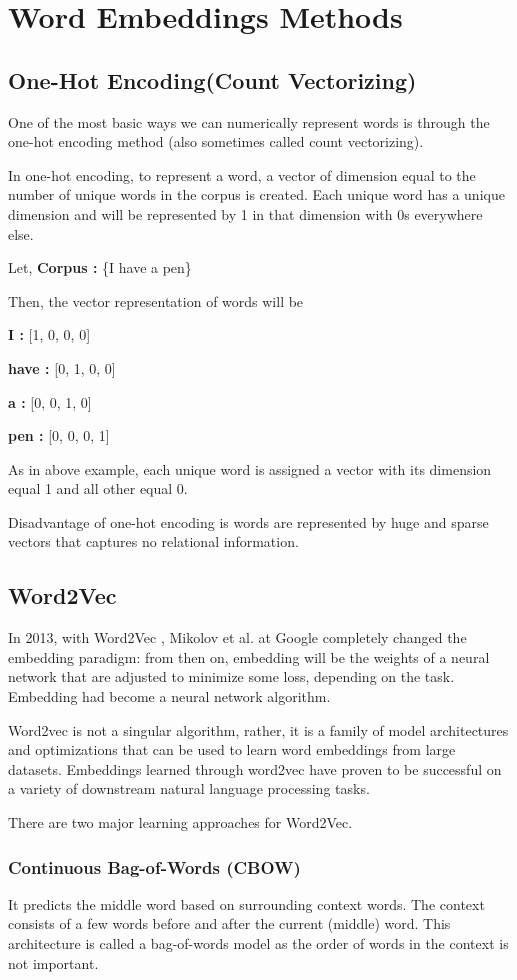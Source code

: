 \section{Word Embeddings Methods}
\subsection{One-Hot Encoding(Count Vectorizing)}
One of the most basic ways we can numerically represent words is through the one-hot encoding method (also sometimes called count vectorizing).

In one-hot encoding, to represent a word, a vector of dimension equal to the number of unique words in the corpus is created. Each unique word has a unique dimension and will be represented by 1 in that dimension with 0s everywhere else.

Let, \textbf{Corpus : } \{I have a pen\}

Then, the vector representation of words will be

\textbf{I : } [1, 0, 0, 0]

\textbf{have : } [0, 1, 0, 0]

\textbf{a : } [0, 0, 1, 0]

\textbf{pen : } [0, 0, 0, 1]

As in above example, each unique word is assigned a vector with its dimension equal 1 and all other equal 0.

Disadvantage of one-hot encoding is words are represented by huge and sparse vectors that captures no relational information.

\subsection{Word2Vec}
In 2013, with Word2Vec , Mikolov et al. at Google completely changed the embedding paradigm: from then on, embedding will be the weights of a neural network that are adjusted to minimize some loss, depending on the task. Embedding had become a neural network algorithm.

Word2vec is not a singular algorithm, rather, it is a family of model architectures and optimizations that can be used to learn word embeddings from large datasets. Embeddings learned through word2vec have proven to be successful on a variety of downstream natural language processing tasks.

There are two major learning approaches for Word2Vec.

\subsubsection{Continuous Bag-of-Words (CBOW)}
It predicts the middle word based on surrounding context words. The context consists of a few words before and after the current (middle) word. This architecture is called a bag-of-words model as the order of words in the context is not important.

